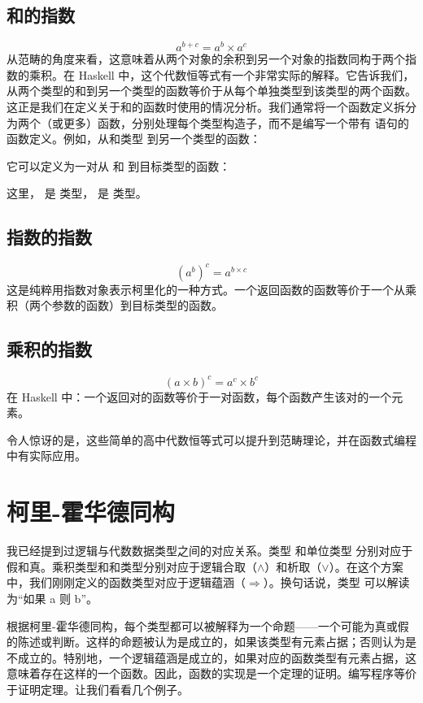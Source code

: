 \subsection{和的指数}

\[a^{b+c} = a^{b} \times a^{c}\]
从范畴的角度来看，这意味着从两个对象的余积到另一个对象的指数同构于两个指数的乘积。在 Haskell 中，这个代数恒等式有一个非常实际的解释。它告诉我们，从两个类型的和到另一个类型的函数等价于从每个单独类型到该类型的两个函数。这正是我们在定义关于和的函数时使用的情况分析。我们通常将一个函数定义拆分为两个（或更多）函数，分别处理每个类型构造子，而不是编写一个带有  语句的函数定义。例如，从和类型  到另一个类型的函数：

它可以定义为一对从  和  到目标类型的函数：

这里， 是  类型， 是  类型。

\subsection{指数的指数}

\[(a^{b})^{c} = a^{b \times c}\]
这是纯粹用指数对象表示柯里化的一种方式。一个返回函数的函数等价于一个从乘积（两个参数的函数）到目标类型的函数。

\subsection{乘积的指数}

\[(a \times b)^{c} = a^{c} \times b^{c}\]
在 Haskell 中：一个返回对的函数等价于一对函数，每个函数产生该对的一个元素。

令人惊讶的是，这些简单的高中代数恒等式可以提升到范畴理论，并在函数式编程中有实际应用。

\section{柯里-霍华德同构}

我已经提到过逻辑与代数数据类型之间的对应关系。类型  和单位类型 \code{()} 分别对应于假和真。乘积类型和和类型分别对应于逻辑合取（$\wedge$）和析取（$\vee$）。在这个方案中，我们刚刚定义的函数类型对应于逻辑蕴涵（$\Rightarrow$）。换句话说，类型  可以解读为“如果 a 则 b”。

根据柯里-霍华德同构，每个类型都可以被解释为一个命题——一个可能为真或假的陈述或判断。这样的命题被认为是成立的，如果该类型有元素占据；否则认为是不成立的。特别地，一个逻辑蕴涵是成立的，如果对应的函数类型有元素占据，这意味着存在这样的一个函数。因此，函数的实现是一个定理的证明。编写程序等价于证明定理。让我们看看几个例子。

